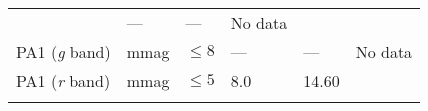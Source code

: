 \documentclass[DM,toc]{lsstdoc}
\begin{document}
\begin{longtable}[]{@{}llllll@{}}
\begin{minipage}[t]{0.17\columnwidth}
\end{minipage} & \begin{minipage}[t]{0.17\columnwidth}\raggedright\strut
---\strut
\end{minipage} & \begin{minipage}[t]{0.12\columnwidth}\raggedright\strut
---\strut
\end{minipage} & \begin{minipage}[t]{0.17\columnwidth}\raggedright\strut
No data\strut
\end{minipage}\tabularnewline
\begin{minipage}[t]{0.14\columnwidth}\raggedright\strut
PA1 (\emph{g} band)\strut
\end{minipage} & \begin{minipage}[t]{0.06\columnwidth}\raggedright\strut
mmag\strut
\end{minipage} & \begin{minipage}[t]{0.17\columnwidth}\raggedright\strut
\(\leq 8\)\strut
\end{minipage} & \begin{minipage}[t]{0.17\columnwidth}\raggedright\strut
---\strut
\end{minipage} & \begin{minipage}[t]{0.12\columnwidth}\raggedright\strut
---\strut
\end{minipage} & \begin{minipage}[t]{0.17\columnwidth}\raggedright\strut
No data\strut
\end{minipage}\tabularnewline
\begin{minipage}[t]{0.14\columnwidth}\raggedright\strut
PA1 (\emph{r} band)\strut
\end{minipage} & \begin{minipage}[t]{0.06\columnwidth}\raggedright\strut
mmag\strut
\end{minipage} & \begin{minipage}[t]{0.17\columnwidth}\raggedright\strut
\(\leq 5\)\strut
\end{minipage} & \begin{minipage}[t]{0.17\columnwidth}\raggedright\strut
8.0\strut
\end{minipage} & \begin{minipage}[t]{0.12\columnwidth}\raggedright\strut
14.60\strut
\end{minipage} & \begin{minipage}[t]{0.17\columnwidth}\raggedright\strut
\strut
\end{minipage}\tabularnewline
\begin{minipage}[t]{0.14\columnwidth}\raggedright\strut

\end{minipage}
\end{longtable}
\end{document}
